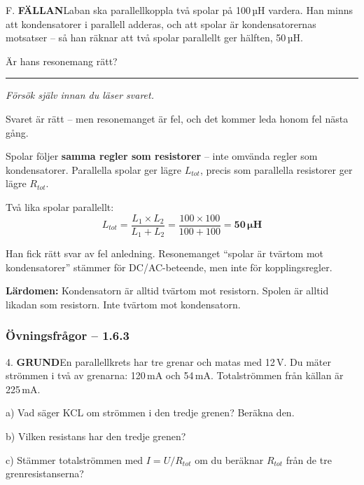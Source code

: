 \documentclass[a4paper,11pt,twoside]{book}
\newcommand{\qgrund}{\colorbox{greenpale}{\textcolor{greendark}{\headingfont\bfseries\tiny GRUND}}}
\newcommand{\qfallan}{\colorbox{ljusbrun}{\textcolor{kakao}{\headingfont\bfseries\tiny FÄLLAN}}}
\begin{document}
\begin{qblock}{F.}
\qfallan\quad Laban ska parallellkoppla två spolar på 
100\,µH vardera. Han minns att kondensatorer i 
parallell adderas, och att spolar är kondensatorernas 
motsatser -- så han räknar att två spolar parallellt 
ger hälften, 50\,µH.

Är hans resonemang rätt?
\end{qblock}

\medskip
\noindent\rule{\textwidth}{0.4pt}
{\small\itshape Försök själv innan du läser svaret.}
\medskip

\begin{worked}[title={Lösning -- Fallgropsfråga 1.6.3\,F}]
Svaret är rätt -- men resonemanget är fel, och det 
kommer leda honom fel nästa gång.

Spolar följer \textbf{samma regler som resistorer} -- 
inte omvända regler som kondensatorer. Parallella 
spolar ger lägre $L_{tot}$, precis som parallella 
resistorer ger lägre $R_{tot}$.

Två lika spolar parallellt:
\[ L_{tot} = \frac{L_1 \times L_2}{L_1 + L_2} = \frac{100 \times 100}{100 + 100} = \mathbf{50\,\mu\text{H}} \]

Han fick rätt svar av fel anledning. Resonemanget 
``spolar är tvärtom mot kondensatorer'' stämmer för 
DC/AC-beteende, men inte för kopplingsregler.

\textbf{Lärdomen:} Kondensatorn är alltid tvärtom 
mot resistorn. Spolen är alltid likadan som 
resistorn. Inte tvärtom mot kondensatorn.
\end{worked}

\subsubsection*{Övningsfrågor -- 1.6.3}

\begin{qblock}{4.}
\qgrund\quad En parallellkrets har tre grenar och matas 
med 12\,V. Du mäter strömmen i två av grenarna: 
120\,mA och 54\,mA. Totalströmmen från källan är 
225\,mA.

a) Vad säger KCL om strömmen i den tredje grenen? 
Beräkna den.

b) Vilken resistans har den tredje grenen?

c) Stämmer totalströmmen med $I = U/R_{tot}$ om du 
beräknar $R_{tot}$ från de tre grenresistanserna?
\end{qblock}
\end{document}

